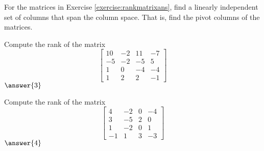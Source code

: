 \documentclass{ximera}
\begin{document}
\begin{exercise}%
    For the matrices in Exercise \ref{exercise:rankmatrixans}, find a linearly independent set of columns that span the column space. That is, find the pivot columns of the matrices.
\end{exercise}

\begin{exercise}
    Compute the rank of the matrix
    \begin{equation*}
        \begin{bmatrix}
            10 & -2 & 11 & -7 \\ 
            -5 & -2 & -5 & 5 \\
            1 & 0 & -4 & -4 \\
            1 & 2 & 2 & -1
        \end{bmatrix} 
    \end{equation*}
    $\answer{3}$
\end{exercise}

\begin{exercise}
    Compute the rank of the matrix
    \begin{equation*}
        \begin{bmatrix}
            4 & -2 & 0 & -4 \\
            3 & -5 & 2 & 0 \\
            1 & -2 & 0 & 1 \\
            -1 & 1 & 3 & -3
        \end{bmatrix} 
    \end{equation*}
    $\answer{4}$
\end{exercise}
\end{document}
